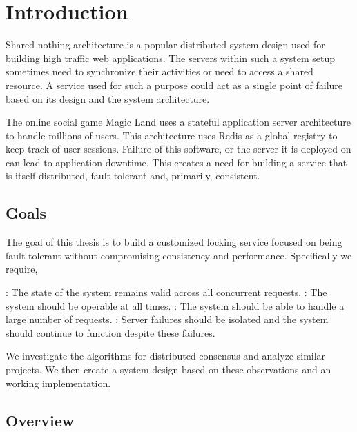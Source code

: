 \chapter{Introduction}
\label{chapter:introduction}

Shared nothing architecture%
 \citep{Stonebraker86g} is a popular distributed system design used for
building high traffic web applications. The servers within such a system setup
sometimes need to synchronize their activities or need to access a shared
resource. A service used for such a purpose could act as a single point of
failure based on its design and the system architecture.

The online social game Magic Land uses a stateful application server
architecture to handle millions of users. This architecture uses Redis as
a global registry to keep track of user sessions. Failure of this
software, or the server it is deployed on can lead to application
downtime. This creates a need for building a service that is itself
distributed, fault tolerant and, primarily, consistent.

\section{Goals}

The goal of this thesis is to build a customized locking service focused on
being fault tolerant without compromising consistency and performance.
Specifically we require,

\begin{itemize}
    : The state of the system remains valid across
    all concurrent requests.
    : The system should be operable at all times.
    : The system should be able to handle a large number of
    requests.
    : Server failures should be isolated and the system
    should continue to function despite these failures.
\end{itemize}

We investigate the algorithms for distributed consensus and analyze similar
projects. We then create a system design based on these observations and
an working implementation.

\section{Overview}

